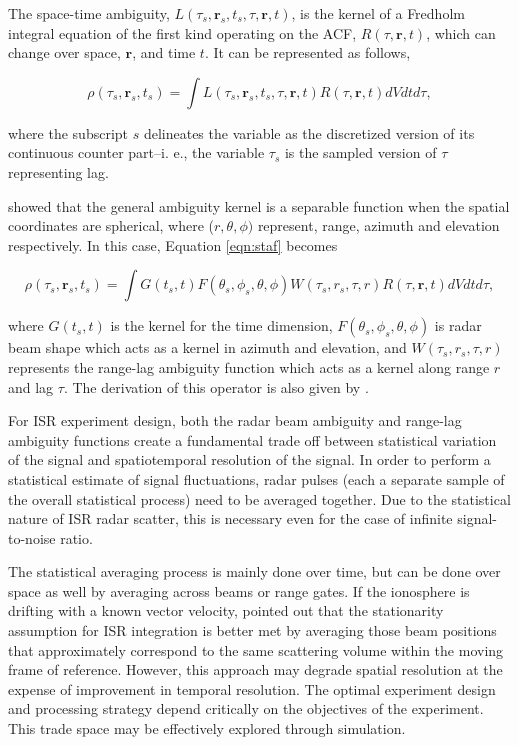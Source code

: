 \documentclass[draft,ras]{agutex}
\begin{document}
\begin{article}
The space-time ambiguity, $L(\tau_s,\mathbf{r}_s,t_s,\tau,\mathbf{r},t)$, is the kernel of a Fredholm integral equation of the first kind operating on the ACF, $R(\tau,\mathbf{r},t)$, which can change over space, $\mathbf{r}$, and time $t$. It can be represented as follows,

 \begin{equation}
  \label{eqn:staf}
  \rho(\tau_s,\mathbf{r}_s,t_s) =\int L(\tau_s,\mathbf{r}_s,t_s,\tau,\mathbf{r},t)R(\tau,\mathbf{r},t)dVdtd\tau,
\end{equation}

\noindent where the subscript $s$ delineates the variable as the discretized version of its continuous counter part--i. e., the variable $\tau_s$ is the sampled version of $\tau$ representing lag. 

\citet{RDS:RDS20236} showed that the general ambiguity kernel is a separable function when the spatial coordinates are spherical, where ($r,\theta,\phi)$ represent, range, azimuth and elevation respectively.  In this case, Equation \ref{eqn:staf} becomes

\begin{equation}
\label{eqn:stafbrok}
\rho(\tau_s,\mathbf{r}_s,t_s)= \int G(t_s,t)F(\theta_s,\phi_s,\theta,\phi)W(\tau_s,r_s,\tau,r) R(\tau,\mathbf{r},t) dVdt d\tau,
\end{equation}

\noindent where $G(t_s,t)$ is the kernel for the time dimension, $F(\theta_s,\phi_s,\theta,\phi)$ is radar beam shape which acts as a kernel in azimuth and elevation, and $W(\tau_s,r_s,\tau,r) $ represents the range-lag ambiguity function which acts as a kernel along range $r$ and lag $\tau$. The derivation of this operator is also given by \citet{RDS:RDS20236}.

For ISR experiment design, both the radar beam ambiguity and range-lag ambiguity functions create a fundamental trade off between statistical variation of the signal and spatiotemporal resolution of the signal. In order to perform a statistical estimate of signal fluctuations, radar pulses (each a separate sample of the overall statistical process) need to be averaged together. Due to the statistical nature of ISR radar scatter, this is necessary even for the case of infinite signal-to-noise ratio.   

The statistical averaging process is mainly done over time, but can be done over space as well by averaging across beams or range gates. If the ionosphere is drifting with a known vector velocity, \citet{RDS:RDS20236} pointed out that the stationarity assumption for ISR integration is  better met by averaging those beam positions that approximately correspond to the same scattering volume within the moving frame of reference. However, this approach may degrade spatial resolution at the expense of improvement in temporal resolution. 
The optimal experiment design and processing strategy depend critically on the objectives of the experiment.   This trade space may be effectively explored through simulation.


\end{article}
\end{document}

